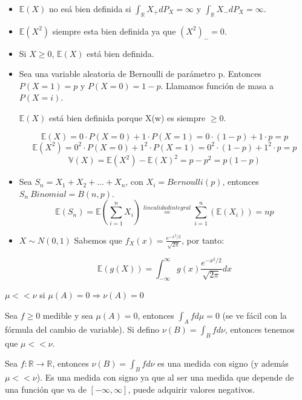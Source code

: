 \documentclass{apuntes}
\begin{document}
\begin{example}
\begin{itemize}
\item $\mathbb{E}(X)$ no esá bien definida si $\int_{\mathbb{R}}X_+ dP_X=\infty$ y $\int_{\mathbb{R}}X_- dP_X=\infty$.

\item $\mathbb{E}(X^2)$ siempre esta bien definida ya que $(X^2)_-=0$.
\item Si $X \geq 0$, $\mathbb{E}(X)$ está bien definida.
\item Sea una variable aleatoria de Bernoulli de parámetro p. Entonces $P(X=1)=p$ y $P(X=0)=1-p$. Llamamos función de masa a $P(X=i)$.

$\mathbb{E}(X)$ está bien definida porque X(w) es siempre $\geq 0$. 

\[
\mathbb{E}(X)=0\cdot P(X=0)+1\cdot P(X=1)=0\cdot(1-p)+1\cdot p=p
\]
\[
\mathbb{E}(X^2)=0^2\cdot P(X=0)+1^2\cdot P(X=1)=0^2\cdot(1-p)+1^2\cdot p=p
\]
\[
\mathbb{V}(X)=\mathbb{E}(X^2)-\mathbb{E}(X)^2=p-p^2=p(1-p)
\]
\item Sea $S_n=X_1+X_2+...+X_n$, con $X_i=Bernoulli(p)$, entonces $S_n ~ Binomial=B(n,p)$.
\[
\mathbb{E}(S_n)=\mathbb{E}(\sum_{i=1}^{n}X_i)\stackrel{linealidad integral}{=}\sum_{i=1}^{n}(\mathbb{E}(X_i))=np
\]
\item $X\sim N(0,1)$
Sabemos que $f_X(x)=\frac{e^{-x^2/2}}{\sqrt{2\pi}}$, por tanto:

\[
\mathbb{E}(g(X))=\int_{-\infty}^{\infty}g(x)\frac{e^{-x^2/2}}{\sqrt{2\pi}}dx
\]
\end{itemize}
\end{example}




\begin{defn}
$\mu << \nu$ si $\mu(A)=0 \Rightarrow \nu(A)=0$

\begin{example}
Sea $f \geq 0$ medible y sea $\mu(A)=0$, entonces $\int_Afd\mu=0$ (se ve fácil con la fórmula del cambio de variable). Si defino $\nu(B)=\int_B fd\nu$, entonces tenemos que $\mu << \nu$.
\end{example}
\end{defn}

\begin{defn}
Sea $f:\mathbb{R}\rightarrow \mathbb{R}$, entonces $\nu(B)=\int_B fd\nu$ es una medida con signo (y además $\mu << \nu$). Es una medida con signo ya que al ser una medida que depende de una función que va de $[-\infty, \infty]$, puede adquirir valores negativos.
\end{defn}
\end{document}
